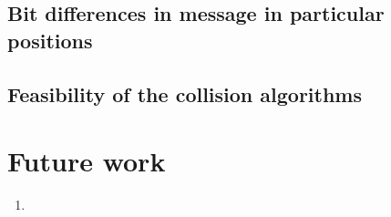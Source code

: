 \subsection{Bit differences in message in particular positions}

\subsection{Feasibility of the collision algorithms}

\section{Future work}

\begin{enumerate}
\item
\end{enumerate}
